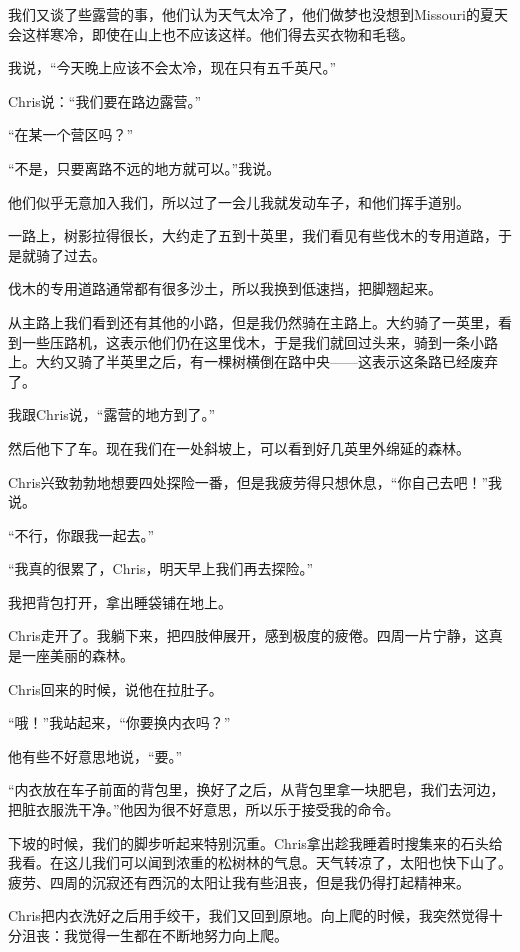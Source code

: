 \documentclass[UTF8]{article}
\begin{document}
\par 我们又谈了些露营的事，他们认为天气太冷了，他们做梦也没想到Missouri的夏天会这样寒冷，即使在山上也不应该这样。他们得去买衣物和毛毯。
\par 我说，“今天晚上应该不会太冷，现在只有五千英尺。”
\par Chris说：“我们要在路边露营。”
\par “在某一个营区吗？”
\par “不是，只要离路不远的地方就可以。”我说。
\par 他们似乎无意加入我们，所以过了一会儿我就发动车子，和他们挥手道别。
\par 一路上，树影拉得很长，大约走了五到十英里，我们看见有些伐木的专用道路，于是就骑了过去。
\par 伐木的专用道路通常都有很多沙土，所以我换到低速挡，把脚翘起来。
\par 从主路上我们看到还有其他的小路，但是我仍然骑在主路上。大约骑了一英里，看到一些压路机，这表示他们仍在这里伐木，于是我们就回过头来，骑到一条小路上。大约又骑了半英里之后，有一棵树横倒在路中央——这表示这条路已经废弃了。
\par 我跟Chris说，“露营的地方到了。”
\par 然后他下了车。现在我们在一处斜坡上，可以看到好几英里外绵延的森林。
\par Chris兴致勃勃地想要四处探险一番，但是我疲劳得只想休息，“你自己去吧！”我说。
\par “不行，你跟我一起去。”
\par “我真的很累了，Chris，明天早上我们再去探险。”
\par 我把背包打开，拿出睡袋铺在地上。
\par Chris走开了。我躺下来，把四肢伸展开，感到极度的疲倦。四周一片宁静，这真是一座美丽的森林。
\par Chris回来的时候，说他在拉肚子。
\par “哦！”我站起来，“你要换内衣吗？”
\par 他有些不好意思地说，“要。”
\par “内衣放在车子前面的背包里，换好了之后，从背包里拿一块肥皂，我们去河边，把脏衣服洗干净。”他因为很不好意思，所以乐于接受我的命令。
\par 下坡的时候，我们的脚步听起来特别沉重。Chris拿出趁我睡着时搜集来的石头给我看。在这儿我们可以闻到浓重的松树林的气息。天气转凉了，太阳也快下山了。疲劳、四周的沉寂还有西沉的太阳让我有些沮丧，但是我仍得打起精神来。
\par Chris把内衣洗好之后用手绞干，我们又回到原地。向上爬的时候，我突然觉得十分沮丧：我觉得一生都在不断地努力向上爬。
\end{document}
